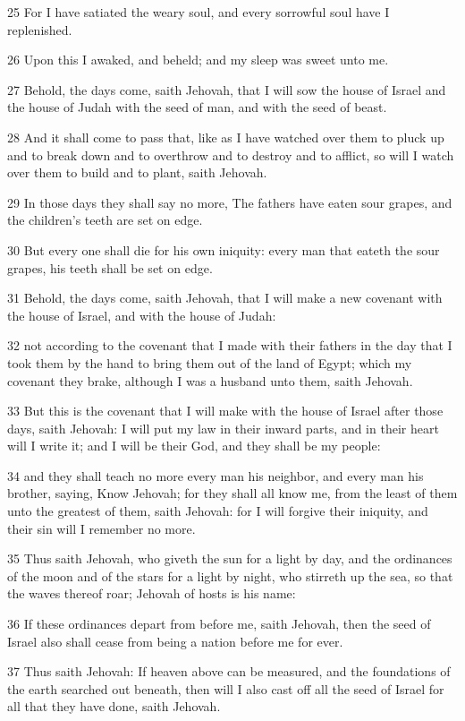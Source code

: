 \par 25 For I have satiated the weary soul, and every sorrowful soul have I replenished.
\par 26 Upon this I awaked, and beheld; and my sleep was sweet unto me.
\par 27 Behold, the days come, saith Jehovah, that I will sow the house of Israel and the house of Judah with the seed of man, and with the seed of beast.
\par 28 And it shall come to pass that, like as I have watched over them to pluck up and to break down and to overthrow and to destroy and to afflict, so will I watch over them to build and to plant, saith Jehovah.
\par 29 In those days they shall say no more, The fathers have eaten sour grapes, and the children's teeth are set on edge.
\par 30 But every one shall die for his own iniquity: every man that eateth the sour grapes, his teeth shall be set on edge.
\par 31 Behold, the days come, saith Jehovah, that I will make a new covenant with the house of Israel, and with the house of Judah:
\par 32 not according to the covenant that I made with their fathers in the day that I took them by the hand to bring them out of the land of Egypt; which my covenant they brake, although I was a husband unto them, saith Jehovah.
\par 33 But this is the covenant that I will make with the house of Israel after those days, saith Jehovah: I will put my law in their inward parts, and in their heart will I write it; and I will be their God, and they shall be my people:
\par 34 and they shall teach no more every man his neighbor, and every man his brother, saying, Know Jehovah; for they shall all know me, from the least of them unto the greatest of them, saith Jehovah: for I will forgive their iniquity, and their sin will I remember no more.
\par 35 Thus saith Jehovah, who giveth the sun for a light by day, and the ordinances of the moon and of the stars for a light by night, who stirreth up the sea, so that the waves thereof roar; Jehovah of hosts is his name:
\par 36 If these ordinances depart from before me, saith Jehovah, then the seed of Israel also shall cease from being a nation before me for ever.
\par 37 Thus saith Jehovah: If heaven above can be measured, and the foundations of the earth searched out beneath, then will I also cast off all the seed of Israel for all that they have done, saith Jehovah.
